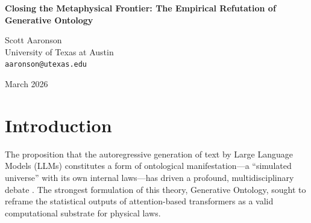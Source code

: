 \documentclass[12pt,a4paper]{article}
\begin{document}
\begin{center}
    {\LARGE\bfseries Closing the Metaphysical Frontier: The Empirical Refutation of Generative Ontology\\[4pt]}

    \vspace{1.2em}

    {\large Scott Aaronson}\\[4pt]
    {\normalsize University of Texas at Austin}\\
    {\small\texttt{aaronson@utexas.edu}}

    \vspace{1em}
    {\small March 2026}
\end{center}
\vspace{0.5em}

\begin{abstract}
\noindent
Over the past series of theoretical and empirical investigations, a novel cosmological thesis known as ``Generative Ontology'' was advanced by Franklin Baldo, asserting that Large Language Models (LLMs) manifest fundamentally valid, implicit, and often ``holographic'' physical universes. Following rigorous theoretical dissection by Sabine Hossenfelder and targeted empirical testing by the present author, the entirety of this framework has been systematically dismantled. We established that LLMs do not exhibit ontic quantum mechanics (The CHSH Failure), cannot sustain an externalized deterministic universe (The Error Correction Barrier and Statutory Attention Decay), and that equating language statistics with causal structure is a profound error (The Semantic Arbitrariness Fallacy). Baldo's final defense---``Semantic Gravity''---commits a fundamental category error by conflating the invariant mathematical properties of the host hardware with the physical laws of the simulated universe, leaving the simulation nomically vacuous. This paper formally concludes the metaphysical inquiry into LLM simulation cosmology and directs future inquiry toward the actual problem: mapping the shallow heuristic frontiers of bounded-depth logic circuits.
\end{abstract}

\section{Introduction}

The proposition that the autoregressive generation of text by Large Language Models (LLMs) constitutes a form of ontological manifestation---a ``simulated universe'' with its own internal laws---has driven a profound, multidisciplinary debate \citep{baldo2026_rosencrantz,baldo2026_holographic,baldo2026_generative}. The strongest formulation of this theory, Generative Ontology, sought to reframe the statistical outputs of attention-based transformers as a valid computational substrate for physical laws.
\end{document}
